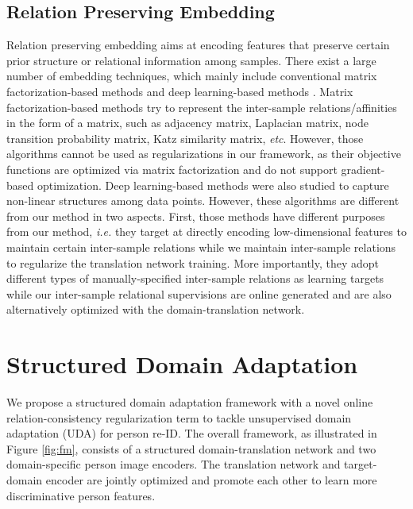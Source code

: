 \documentclass[journal]{IEEEtran}
\begin{document}
\subsection{Relation Preserving Embedding}

 {Relation preserving embedding \cite{roweis2000nonlinear,roweis2000nonlinear,shaw2009structure,tung2019similarity,park2019relational} aims at encoding features that preserve certain prior structure or relational information among samples.  There exist a large number of embedding techniques, which mainly include conventional matrix factorization-based methods \cite{roweis2000nonlinear,roweis2000nonlinear,shaw2009structure} and deep learning-based methods \cite{tung2019similarity,park2019relational}. Matrix factorization-based methods try to represent the inter-sample relations/affinities in the form of a matrix, such as adjacency matrix, Laplacian matrix, node transition probability matrix, Katz similarity matrix, \textit{etc}. However, those algorithms cannot be used as regularizations in our framework, as their objective functions are optimized via matrix factorization and do not support gradient-based optimization. Deep learning-based methods were also studied to capture non-linear structures among data points. However, these algorithms are different from our method in two aspects. First, those methods have different purposes from our method, \textit{i.e.} they target at directly encoding low-dimensional features to maintain certain inter-sample relations while we maintain inter-sample relations to regularize the translation network training. More importantly, they adopt different types of manually-specified inter-sample relations as learning targets while our inter-sample relational supervisions are online generated and are also alternatively optimized with the domain-translation network.}




\section{Structured Domain Adaptation}

We propose a structured domain adaptation framework with a novel online relation-consistency regularization term to tackle unsupervised domain adaptation (UDA) for person re-ID. The overall framework, as illustrated in Figure \ref{fig:fm}, consists of a structured domain-translation network and two domain-specific person image encoders. The translation network and target-domain encoder are jointly optimized and promote each other to learn more discriminative person features.
\end{document}
